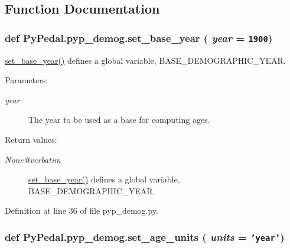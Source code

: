 \subsection{Function Documentation}
\hypertarget{namespacePyPedal_1_1pyp__demog_22e55927dbf33815e5692914eb47c24b}{
\subsubsection[set\_\-base\_\-year]{\setlength{\rightskip}{0pt plus 5cm}def Py\-Pedal.pyp\_\-demog.set\_\-base\_\-year ( {\em year} = {\tt 1900})}}
\label{namespacePyPedal_1_1pyp__demog_22e55927dbf33815e5692914eb47c24b}


\hyperlink{namespacePyPedal_1_1pyp__demog_22e55927dbf33815e5692914eb47c24b}{set\_\-base\_\-year()} defines a global variable, BASE\_\-DEMOGRAPHIC\_\-YEAR. 

\begin{Desc}
\item[Parameters:]
\begin{description}
\item[{\em year}]The year to be used as a base for computing ages. \end{description}
\end{Desc}
\begin{Desc}
\item[Return values:]
\begin{description}
\item[{\em None@verbatim}]\hyperlink{namespacePyPedal_1_1pyp__demog_22e55927dbf33815e5692914eb47c24b}{set\_\-base\_\-year()} defines a global variable, BASE\_\-DEMOGRAPHIC\_\-YEAR.  \end{description}
\end{Desc}


Definition at line 36 of file pyp\_\-demog.py.\hypertarget{namespacePyPedal_1_1pyp__demog_6ccb10175c232e1f937d6b2c246de9a5}{
\subsubsection[set\_\-age\_\-units]{\setlength{\rightskip}{0pt plus 5cm}def Py\-Pedal.pyp\_\-demog.set\_\-age\_\-units ( {\em units} = {\tt 'year'})}}
\label{namespacePyPedal_1_1pyp__demog_6ccb10175c232e1f937d6b2c246de9a5}


